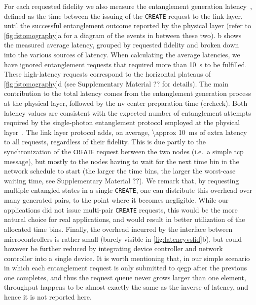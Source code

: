 For each requested fidelity we also measure the entanglement generation
latency~\cite{dahlberg_2019_egp}, defined as the time between the issuing of the \texttt{CREATE}
request to the link layer, until the successful entanglement outcome reported by the physical layer
(refer to \cref{fig:fstomography}a for a diagram of the events in between these two).
b shows the measured average latency, grouped by requested fidelity and
broken down into the various sources of latency. When calculating the average latencies, we have
ignored entanglement requests that required more than \qty{10}{s} to be fulfilled. These
high-latency requests correspond to the horizontal plateaus of \cref{fig:fstomography}d (see
Supplementary Material ?? for details). The main contribution to the total latency comes from the
entanglement generation process at the physical layer, followed by the \acrshort{nv} center
preparation time (\acrshort{crcheck}). Both latency values are consistent with the expected number
of entanglement attempts required by the single-photon entanglement protocol employed at the
physical layer~\cite{humphreys_2018_delivery}. The link layer protocol adds, on average,
\qty{\approx 10}{\ms} of extra latency to all requests, regardless of their fidelity. This is due
partly to the synchronization of the \texttt{CREATE} request between the two nodes (i.e.~a simple
\acrshort{tcp} message), but mostly to the nodes having to wait for the next time bin in the network
schedule to start (the larger the time bins, the larger the worst-case waiting time, see
Supplementary Material ??). We remark that, by requesting multiple entangled states in a single
\texttt{CREATE}, one can distribute this overhead over many generated pairs, to the point where it
becomes negligible. While our applications did not issue multi-pair \texttt{CREATE} requests, this
would be the more natural choice for real applications, and would result in better utilization of
the allocated time bins. Finally, the overhead incurred by the interface between microcontrollers is
rather small (barely visible in \cref{fig:latencyvsfid}b), but could however be further reduced by
integrating device controller and network controller into a single device. It is worth mentioning
that, in our simple scenario in which each entanglement request is only submitted to \acrshort{qegp}
after the previous one completes, and thus the request queue never grows larger than one element,
throughput happens to be almost exactly the same as the inverse of latency, and hence it is not
reported here.

